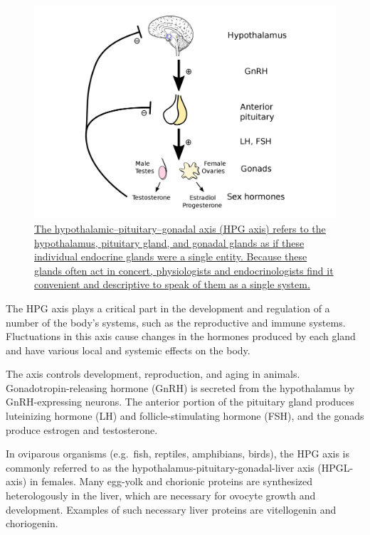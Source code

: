 \begin{figure}

{\centering \includegraphics[width=0.7\linewidth]{./figures/endocrine/Hypothalamic–pituitary–gonadal_axis} 

}

\caption{\href{https://commons.wikimedia.org/wiki/File:Hypothalamic–pituitary–gonadal_axis.svg}{The hypothalamic--pituitary--gonadal axis (HPG axis) refers to the hypothalamus, pituitary gland, and gonadal glands as if these individual endocrine glands were a single entity. Because these glands often act in concert, physiologists and endocrinologists find it convenient and descriptive to speak of them as a single system.}}\label{fig:hpgonadal}
\end{figure}

The HPG axis plays a critical part in the development and regulation of a number of the body's systems, such as the reproductive and immune systems. Fluctuations in this axis cause changes in the hormones produced by each gland and have various local and systemic effects on the body.

The axis controls development, reproduction, and aging in animals. Gonadotropin-releasing hormone (GnRH) is secreted from the hypothalamus by GnRH-expressing neurons. The anterior portion of the pituitary gland produces luteinizing hormone (LH) and follicle-stimulating hormone (FSH), and the gonads produce estrogen and testosterone.

In oviparous organisms (e.g.~fish, reptiles, amphibians, birds), the HPG axis is commonly referred to as the hypothalamus-pituitary-gonadal-liver axis (HPGL-axis) in females. Many egg-yolk and chorionic proteins are synthesized heterologously in the liver, which are necessary for ovocyte growth and development. Examples of such necessary liver proteins are vitellogenin and choriogenin.

